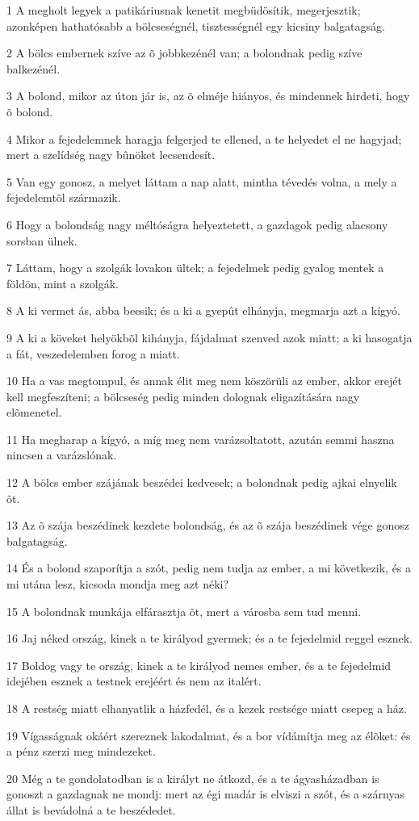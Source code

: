 \par 1 A megholt legyek a patikáriusnak kenetit megbüdösítik, megerjesztik; azonképen hathatósabb a bölcseségnél, tisztességnél egy kicsiny balgatagság.
\par 2 A bölcs embernek szíve az õ jobbkezénél van; a bolondnak pedig szíve balkezénél.
\par 3 A bolond, mikor az úton jár is, az õ elméje hiányos, és mindennek hirdeti, hogy õ bolond.
\par 4 Mikor a fejedelemnek haragja felgerjed te ellened, a te helyedet el ne hagyjad; mert a szelídség nagy bûnöket lecsendesít.
\par 5 Van egy gonosz, a melyet láttam a nap alatt, mintha tévedés volna, a mely a fejedelemtõl származik.
\par 6 Hogy a bolondság nagy méltóságra helyeztetett, a gazdagok pedig alacsony sorsban ülnek.
\par 7 Láttam, hogy a szolgák lovakon ültek; a fejedelmek pedig gyalog mentek a földön, mint a szolgák.
\par 8 A ki vermet ás, abba beesik; és a ki a gyepût elhányja, megmarja azt a kígyó.
\par 9 A ki a köveket helyökbõl kihányja, fájdalmat szenved azok miatt; a ki hasogatja a fát, veszedelemben forog a miatt.
\par 10 Ha a vas megtompul, és annak élit meg nem köszörüli az ember, akkor erejét kell megfeszíteni; a bölcseség pedig minden dolognak eligazítására nagy elõmenetel.
\par 11 Ha megharap a kígyó, a míg meg nem varázsoltatott, azután semmi haszna nincsen a varázslónak.
\par 12 A bölcs ember szájának beszédei kedvesek; a bolondnak pedig ajkai elnyelik õt.
\par 13 Az õ szája beszédinek kezdete bolondság, és az õ szája beszédinek vége gonosz balgatagság.
\par 14 És a bolond szaporítja a szót, pedig nem tudja az ember, a mi következik, és a mi utána lesz, kicsoda mondja meg azt néki?
\par 15 A bolondnak munkája elfárasztja õt, mert a városba sem tud menni.
\par 16 Jaj néked ország, kinek a te királyod gyermek; és a te fejedelmid reggel esznek.
\par 17 Boldog vagy te ország, kinek a te királyod nemes ember, és a te fejedelmid idejében esznek a testnek erejéért és nem az italért.
\par 18 A restség miatt elhanyatlik a házfedél, és a kezek restsége miatt csepeg a ház.
\par 19 Vígasságnak okáért szereznek lakodalmat, és a bor vídámítja meg az élõket: és a pénz szerzi meg mindezeket.
\par 20 Még a te gondolatodban is a királyt ne átkozd, és a te ágyasházadban is gonoszt a gazdagnak ne mondj: mert az égi madár is elviszi a szót, és a szárnyas állat is bevádolná a te beszédedet.


